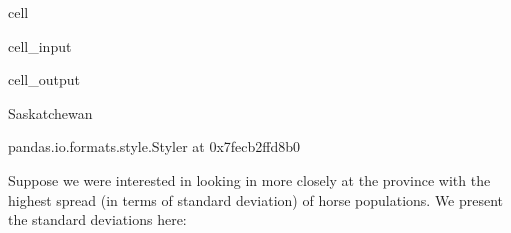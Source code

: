 \documentclass[letterpaper,10pt,english]{jupyterBook}
\begin{document}
\begin{sphinxuseclass}{cell}\begin{sphinxVerbatimInput}

\begin{sphinxuseclass}{cell_input}
\begin{sphinxVerbatim}[commandchars=\\\{\}]
  

  \PYG{p}{[}\PYG{p}{]}\PYG{p}{[}\PYG{p}{]}
 

  
 
\end{sphinxVerbatim}

\end{sphinxuseclass}\end{sphinxVerbatimInput}
\begin{sphinxVerbatimOutput}

\begin{sphinxuseclass}{cell_output}
\begin{sphinxVerbatim}[commandchars=\\\{\}]
\PYGZsq{}Saskatchewan\PYGZsq{}
\end{sphinxVerbatim}

\begin{sphinxVerbatim}[commandchars=\\\{\}]
\PYGZlt{}pandas.io.formats.style.Styler at 0x7fecb2ffd8b0\PYGZgt{}
\end{sphinxVerbatim}

\end{sphinxuseclass}\end{sphinxVerbatimOutput}

\end{sphinxuseclass}
\sphinxAtStartPar
Suppose we were interested in looking in more closely at the
province with the highest spread (in terms of standard deviation)
of horse populations. We present the standard deviations here:
\end{document}
